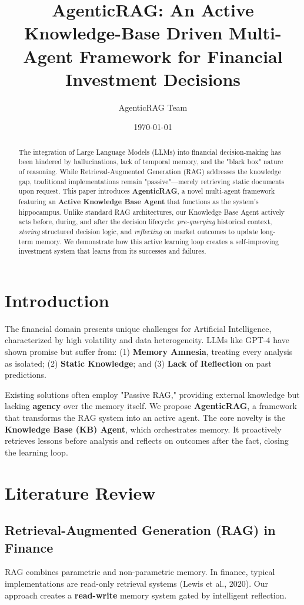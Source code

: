 \documentclass[11pt, a4paper]{article}
\title{\textbf{AgenticRAG: An Active Knowledge-Base Driven Multi-Agent Framework for Financial Investment Decisions}}
\author{AgenticRAG Team}
\date{\today}
\begin{document}
\maketitle

\begin{abstract}
The integration of Large Language Models (LLMs) into financial decision-making has been hindered by hallucinations, lack of temporal memory, and the "black box" nature of reasoning. While Retrieval-Augmented Generation (RAG) addresses the knowledge gap, traditional implementations remain "passive"—merely retrieving static documents upon request. This paper introduces \textbf{AgenticRAG}, a novel multi-agent framework featuring an \textbf{Active Knowledge Base Agent} that functions as the system's hippocampus. Unlike standard RAG architectures, our Knowledge Base Agent actively acts before, during, and after the decision lifecycle: \textit{pre-querying} historical context, \textit{storing} structured decision logic, and \textit{reflecting} on market outcomes to update long-term memory. We demonstrate how this active learning loop creates a self-improving investment system that learns from its successes and failures.
\end{abstract}

\section{Introduction}

The financial domain presents unique challenges for Artificial Intelligence, characterized by high volatility and data heterogeneity. LLMs like GPT-4 have shown promise but suffer from: (1) \textbf{Memory Amnesia}, treating every analysis as isolated; (2) \textbf{Static Knowledge}; and (3) \textbf{Lack of Reflection} on past predictions.

Existing solutions often employ "Passive RAG," providing external knowledge but lacking \textbf{agency} over the memory itself. We propose \textbf{AgenticRAG}, a framework that transforms the RAG system into an active agent. The core novelty is the \textbf{Knowledge Base (KB) Agent}, which orchestrates memory. It proactively retrieves lessons before analysis and reflects on outcomes after the fact, closing the learning loop.

\section{Literature Review}

\subsection{Retrieval-Augmented Generation (RAG) in Finance}
RAG combines parametric and non-parametric memory. In finance, typical implementations are read-only retrieval systems (Lewis et al., 2020). Our approach creates a \textbf{read-write} memory system gated by intelligent reflection.
\end{document}
